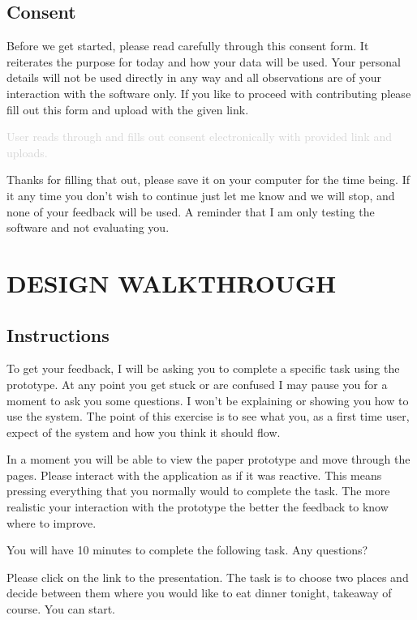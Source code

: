 \documentclass[a4 paper, 10pt]{article}
\begin{document}
    \subsection*{Consent}
        \begin{itshape}
            Before we get started, please read carefully through this consent form. It reiterates the purpose for today and how your data will be used. Your personal details will not be used directly in any way and all observations are of your interaction with the software only. If you like to proceed with contributing please fill out this form and upload with the given link.
        \end{itshape}
        \textcolor{lightgray}
            {User reads through and fills out consent electronically with provided link and uploads.}
        
        \begin{itshape}
            Thanks for filling that out, please save it on your computer for the time being. If it any time you don’t wish to continue just let me know and we will stop, and none of your feedback will be used. A reminder that I am only testing the software and not evaluating you.
        \end{itshape}

\section*{DESIGN WALKTHROUGH}
    \subsection*{Instructions}
        \begin{itshape}
            To get your feedback, I will be asking you to complete a specific task using the prototype. At any point you get stuck or are confused I may pause you for a moment to ask you some questions. I won’t be explaining or showing you how to use the system. The point of this exercise is to see what you, as a first time user, expect of the system and how you think it should flow.

            In a moment you will be able to view the paper prototype and move through the pages. Please interact with the application as if it was reactive. This means pressing everything that you normally would to complete the task. The more realistic your interaction with the prototype the better the feedback to know where to improve. 

            You will have 10 minutes to complete the following task. Any questions? 

            Please click on the link to the presentation. The task is to choose two places and decide between them where you would like to eat dinner tonight, takeaway of course. You can start.
        \end{itshape}
\end{document}
